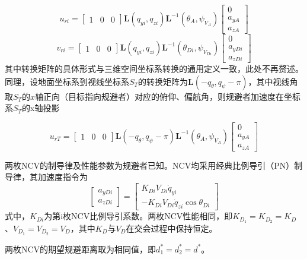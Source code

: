 \begin{equation}
\label{eq:6}
{u_{ri}} = \left[ {\begin{array}{*{20}{c}}
  1&0&0 
\end{array}} \right]{\mathbf{L}}({q_{yi}},{q_{zi}}){{\mathbf{L}}^{ - 1}}({\theta _A},{\psi _{{V_A}}})\left[ {\begin{array}{*{20}{c}}
  0 \\ 
  {{a_{yA}}} \\ 
  {{a_{zA}}} 
\end{array}} \right]
\end{equation}
\begin{equation}
\label{eq:7}
{v_{ri}} = \left[ {\begin{array}{*{20}{c}}
  1&0&0 
\end{array}} \right]{\mathbf{L}}({q_{yi}},{q_{zi}}){{\mathbf{L}}^{ - 1}}({\theta _{Di}},{\psi _{{V_{Di}}}})\left[ {\begin{array}{*{20}{c}}
  0 \\ 
  {{a_{yDi}}} \\ 
  {{a_{zDi}}} 
\end{array}} \right]
\end{equation}
其中转换矩阵的具体形式与三维空间坐标系转换的通用定义一致，此处不再赘述。同理，设地面坐标系到视线坐标系${S_T}$的转换矩阵为${\mathbf{L}}( - {q_\theta },{q_\psi } - \pi )$，其中视线角取${S_T}$的$x$轴正向（目标指向规避者）对应的俯仰、偏航角，则规避者加速度在坐标系${S_T}$的x轴投影

\begin{equation}
\label{eq:8}
{u_{rT}} = \left[ {\begin{array}{*{20}{c}}
  1&0&0 
\end{array}} \right]{\mathbf{L}}( - {q_\theta },{q_\psi } - \pi ){{\mathbf{L}}^{ - 1}}({\theta _A},{\psi _{{V_A}}})\left[ {\begin{array}{*{20}{c}}
  0 \\ 
  {{a_{yA}}} \\ 
  {{a_{zA}}} 
\end{array}} \right]
\end{equation}
\begin{assumption}[NCV制导律与性能]
\label{asm:ncv}
两枚NCV的制导律及性能参数为规避者已知。NCV均采用经典比例导引（PN）制导律\cite{murtaugh1966}，其加速度指令为
\begin{equation}
\label{eq:9}
\left[ {\begin{array}{*{20}{c}}
  {{a_{yDi}}} \\ 
  {{a_{zDi}}} 
\end{array}} \right] = \left[ {\begin{array}{*{20}{c}}
  {{K_{Di}}{V_{Di}}{{\dot q}_{yi}}} \\ 
  { - {K_{Di}}{V_{Di}}{{\dot q}_{zi}}\cos {\theta _{Di}}} 
\end{array}} \right]
\end{equation}
式中，${K_{Di}}$为第i枚NCV比例导引系数。两枚NCV性能相同，即${K_{{D_1}}} = {K_{{D_2}}} = {K_D}$、${V_{{D_1}}} = {V_{{D_2}}} = {V_D}$，其中${K_D}$与${V_D}$在交会过程中保持恒定。
\end{assumption}
两枚NCV的期望规避距离取为相同值，即$d_1^* = d_2^* = d^*$。

